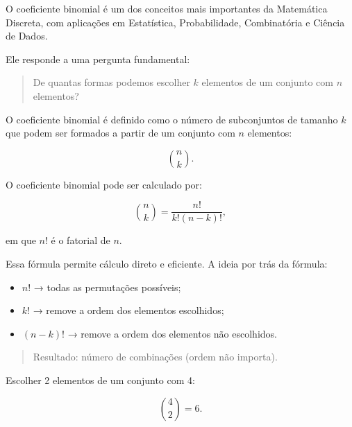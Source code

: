 \documentclass[
  letterpaper,
  DIV=11,
  numbers=noendperiod]{scrreprt}
\providecommand{\tightlist}{%
  \setlength{\itemsep}{0pt}\setlength{\parskip}{0pt}}\usepackage{longtable,booktabs,array}
\begin{document}
O coeficiente binomial é um dos conceitos mais importantes da Matemática
Discreta, com aplicações em Estatística, Probabilidade, Combinatória e
Ciência de Dados.

Ele responde a uma pergunta fundamental:

\begin{quote}
De quantas formas podemos escolher \(k\) elementos de um conjunto com
\(n\) elementos?
\end{quote}

O coeficiente binomial é definido como o número de subconjuntos de
tamanho \(k\) que podem ser formados a partir de um conjunto com \(n\)
elementos:

\[\binom{n}{k}.\]

O coeficiente binomial pode ser calculado por:

\[\binom{n}{k} = \frac{n!}{k!(n-k)!},\]

em que \(n!\) é o fatorial de \(n\).

Essa fórmula permite cálculo direto e eficiente. A ideia por trás da
fórmula:

\begin{itemize}
\tightlist
\item
  \(n!\) → todas as permutações possíveis;\\
\item
  \(k!\) → remove a ordem dos elementos escolhidos;\\
\item
  \((n-k)!\) → remove a ordem dos elementos não escolhidos.
\end{itemize}

\begin{quote}
Resultado: número de combinações (ordem não importa).
\end{quote}

\begin{tcolorbox}[enhanced jigsaw, colback=white, leftrule=.75mm, colbacktitle=quarto-callout-important-color!10!white, breakable, titlerule=0mm, bottomtitle=1mm, title=\textcolor{quarto-callout-important-color}{\faExclamation}\hspace{0.5em}{Exemplo}, colframe=quarto-callout-important-color-frame, toprule=.15mm, opacityback=0, bottomrule=.15mm, opacitybacktitle=0.6, arc=.35mm, toptitle=1mm, rightrule=.15mm, coltitle=black, left=2mm]

Escolher 2 elementos de um conjunto com 4:

\[\binom{4}{2} = 6.\]

\end{tcolorbox}
\end{document}
